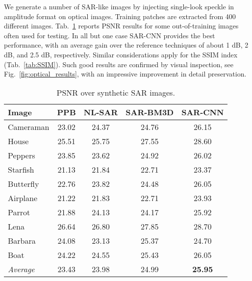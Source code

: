 \documentclass{article}
\begin{document}
We generate a number of SAR-like images by injecting single-look speckle in amplitude format on optical images.
Training patches are extracted from 400 different images.
Tab.~\ref{tab:PSNR} reports PSNR results for some out-of-training images often used for testing.
In all but one case SAR-CNN provides the best performance, with an average gain over the reference techniques of about 1 dB, 2 dB, and 2.5 dB, respectively. Similar considerations apply for the SSIM index (Tab.~\ref{tab:SSIM}). Such good results are confirmed by visual inspection, see Fig.~\ref{fig:optical_results}, with an impressive improvement in detail preservation.


\begin{table}[t]
	\centering
	\caption{PSNR over synthetic SAR images.}
	\label{tab:PSNR}
	\footnotesize
	\begin{tabular}{lcccc}
		\toprule
		Image     &  PPB   & NL-SAR & SAR-BM3D & SAR-CNN \\ \midrule
		Cameraman &  23.02 &  24.37 &    24.76 &   26.15 \\
		House     &  25.51 &  25.75 &    27.55 &   28.60 \\
		Peppers   &  23.85 &  23.62 &    24.92 &   26.02 \\
		Starfish  &  21.13 &  21.84 &    22.71 &   23.37 \\
		Butterfly &  22.76 &  23.82 &    24.48 &   26.05 \\
		Airplane  &  21.22 &  21.83 &    22.71 &   23.93 \\
		Parrot    &  21.88 &  24.13 &    24.17 &   25.92 \\
		Lena      &  26.64 &  26.80 &    27.85 &   28.70 \\
		Barbara   &  24.08 &  23.13 &    25.37 &   24.70 \\
		Boat      &  24.22 &  24.55 &    25.43 &   26.05 \\ \midrule
\textsl{Average}  &  23.43 &  23.98 &    24.99 &   \textbf{25.95} \\
		\bottomrule
	\end{tabular}
\end{table}
\end{document}
